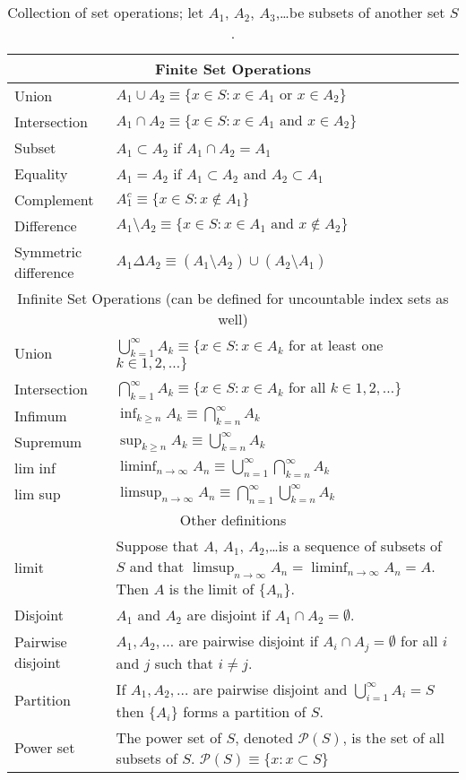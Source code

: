 \begin{itemize}
\begin{table*}[t]
\begin{tabular}{lp{4in}}
  \toprule
  \multicolumn{2}{c}{Finite Set Operations} \\
  \midrule
  Union        & $A_1 \cup A_2 \equiv \{x \in S : x \in A_1 \text{ or } x\in A_2\}$ \\
  Intersection & $A_1 \cap A_2 \equiv \{x \in S : x \in A_1 \text{ and } x \in A_2\}$ \\
  Subset       & $A_1 \subset A_2$ if $A_1 \cap A_2 = A_1$ \\
  Equality     & $A_1 = A_2$ if $A_1 \subset A_2$ and $A_2 \subset A_1$ \\
  Complement   & $A_1^c \equiv \{x \in S : x \notin A_1\}$ \\
  Difference   & $A_1 \setminus A_2 \equiv \{x \in S : x \in A_1 \text{ and } x \notin A_2\}$ \\
  Symmetric difference & $A_1 \Delta A_2 \equiv (A_1 \setminus A_2) \cup (A_2 \setminus A_1)$ \\
  \midrule
  \multicolumn{2}{c}{Infinite Set Operations (can be defined for uncountable index sets as well)} \\
  \midrule
  Union        & $\bigcup_{k=1}^\infty A_k \equiv \{x \in S : x \in A_k$ for at least one $k \in 1,2,\dots\}$ \\
  Intersection & $\bigcap_{k=1}^\infty A_k \equiv \{x \in S : x \in A_k$ for all $k \in 1,2,\dots\}$ \\
  Infimum      & $\inf_{k \geq n} A_k \equiv \bigcap_{k=n}^\infty A_k$ \\
  Supremum     & $\sup_{k \geq n} A_k \equiv \bigcup_{k=n}^\infty A_k$ \\
  lim inf      & $\liminf_{n \to \infty} A_n \equiv \bigcup_{n=1}^\infty \bigcap_{k=n}^\infty A_k$ \\
  lim sup      & $\limsup_{n \to \infty} A_n \equiv \bigcap_{n=1}^\infty \bigcup_{k=n}^\infty A_k$ \\
  \midrule
  \multicolumn{2}{c}{Other definitions} \\
  \midrule
  limit 
  & Suppose that $A$, $A_1$, $A_2$,\dots is a sequence of subsets of $S$ and that $\limsup_{n \to \infty} A_n = \liminf_{n \to \infty} A_n = A$.
  Then $A$ is the limit of $\{A_n\}$. \\
  Disjoint 
  & $A_1$ and $A_2$ are disjoint if $A_1 \cap A_2 = \emptyset$. \\
  Pairwise disjoint 
  & $A_1, A_2, \dots$ are pairwise disjoint if $A_i \cap A_j = \emptyset$ for all $i$ and $j$ such that $i \neq j$. \\
  Partition & If $A_1,A_2,\dots$ are pairwise disjoint and $\bigcup_{i=1}^\infty A_i = S$ then $\{A_i\}$ forms a partition of $S$. \\
  Power set & The power set of $S$, denoted $\mathcal{P}(S)$, is the set of all subsets of $S$.
  $\mathcal{P}(S) \equiv \{x : x \subset S\}$ \\
\bottomrule
\end{tabular}
  \caption{Collection of set operations; let $A_1$, $A_2$, $A_3$,\dots be subsets of another set $S$.}
  \label{tab:1}
\end{table*}


\end{itemize}
